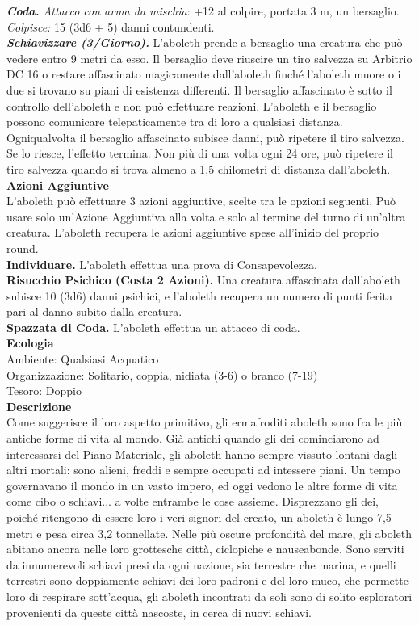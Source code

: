 \begin{multicols}{2}
\emph{\textbf{Coda.} Attacco con arma da mischia}: +12 al colpire, portata 3 m, un bersaglio.\\
\emph{Colpisce:} 15 (3d6 + 5) danni contundenti.\\
\emph{\textbf{Schiavizzare (3/Giorno).}} L'aboleth prende a bersaglio
una creatura che può vedere entro 9 metri da esso. Il bersaglio deve
riuscire un tiro salvezza su Arbitrio DC  16 o restare affascinato
magicamente dall'aboleth finché l'aboleth muore o i due si trovano su
piani di esistenza differenti. Il bersaglio affascinato è sotto il
controllo dell'aboleth e non può effettuare reazioni. L'aboleth e il
bersaglio possono comunicare telepaticamente tra di loro a qualsiasi
distanza.\\
Ogniqualvolta il bersaglio affascinato subisce danni, può ripetere il
tiro salvezza. Se lo riesce, l'effetto termina. Non più di una volta
ogni 24 ore, può ripetere il tiro salvezza quando si trova almeno a 1,5
chilometri di distanza dall'aboleth.\\
\textbf{Azioni Aggiuntive}\\
L'aboleth può effettuare 3 azioni aggiuntive, scelte tra le opzioni seguenti. Può usare solo un'Azione Aggiuntiva alla volta e solo al termine del turno di un'altra creatura. L'aboleth recupera le azioni aggiuntive spese all'inizio del proprio round.\\
\textbf{Individuare.} L'aboleth effettua una prova di Consapevolezza. \\
\textbf{Risucchio Psichico (Costa 2 Azioni).} Una creatura affascinata dall'aboleth subisce 10 (3d6) danni psichici, e l'aboleth recupera un numero di punti ferita pari al danno subito dalla creatura.\\
\textbf{Spazzata di Coda.} L'aboleth effettua un attacco di coda.\\
\textbf{Ecologia}\\
Ambiente: Qualsiasi Acquatico\\
Organizzazione: Solitario, coppia, nidiata (3-6) o branco (7-19)\\
Tesoro: Doppio\\
\textbf{Descrizione}\\
Come suggerisce il loro aspetto primitivo, gli ermafroditi aboleth sono fra le più antiche forme di vita al mondo. Già antichi quando gli dei cominciarono ad interessarsi del Piano Materiale, gli aboleth hanno sempre vissuto lontani dagli altri mortali: sono alieni, freddi e sempre occupati ad intessere piani. Un tempo governavano il mondo in un vasto impero, ed oggi vedono le altre forme di vita come cibo o schiavi... a volte entrambe le cose assieme. Disprezzano gli dei, poiché ritengono di essere loro i veri signori del creato, un aboleth è lungo 7,5 metri e pesa circa 3,2 tonnellate. Nelle più oscure profondità del mare, gli aboleth abitano ancora nelle loro grottesche città, ciclopiche e nauseabonde. Sono serviti da innumerevoli schiavi presi da ogni nazione, sia terrestre che marina, e quelli terrestri sono doppiamente schiavi dei loro padroni e del loro muco, che permette loro di respirare sott'acqua, gli aboleth incontrati da soli sono di solito esploratori provenienti da queste città nascoste, in cerca di nuovi schiavi.\\

\end{multicols}
